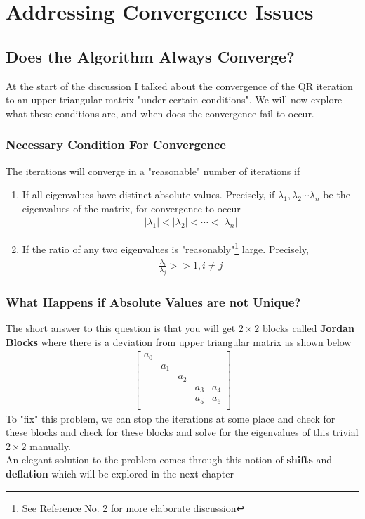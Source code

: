 
\chapter{Addressing Convergence Issues}

\label{Chapter4}


\section{Does the Algorithm Always Converge?}
At the start of the discussion I talked about the convergence of the QR iteration to an upper triangular matrix "under certain conditions". We will now explore what these conditions are, and when does the convergence fail to occur. 
\subsection{Necessary Condition For Convergence}
The iterations will converge in a "reasonable" number of iterations if
\begin{enumerate}
    \item If all eigenvalues have distinct absolute values. Precisely, if $\lambda_1, \lambda_2 \cdots \lambda_n$ be the eigenvalues of the matrix, for convergence to occur
    \begin{align}
        |\lambda_1| < |\lambda_2|< \cdots < |\lambda_n|
    \end{align}
    \item If the ratio of any two eigenvalues is "reasonably"\footnote{See Reference No. 2 for more elaborate discussion} large. Precisely,
    \begin{align}
        \frac{\lambda_i}{\lambda_j} >> 1, i \ne j
    \end{align}
\end{enumerate}

\subsection{What Happens if Absolute Values are not Unique?}
The short answer to this question is that you will get $2 \times 2$ blocks called \textbf{Jordan Blocks} where there is a deviation from upper triangular matrix as shown below
\begin{align}
    \begin{bmatrix}
        a_0 & & & &  \\
         & a_1 & & &  \\
         & & a_2 & & \\
         & &  & a_3 &a_4\\
         & & & a_5& a_6\\
    \end{bmatrix}
\end{align}
To "fix" this problem, we can stop the iterations at some place and check for these blocks and check for these blocks and solve for the eigenvalues of this trivial $2 \times 2$ manually.\\

An elegant solution to the problem comes through this notion of \textbf{shifts} and \textbf{deflation} which will be explored in the next chapter
